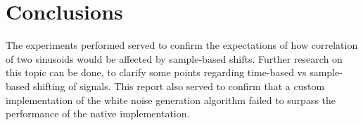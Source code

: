 \section{Conclusions}
The experiments performed served to confirm the expectations of how correlation of two sinusoids would be affected by sample-based shifts. Further research on this topic can be done, to clarify some points regarding time-based vs sample-based shifting of signals. This report also served to confirm that a custom implementation of the white noise generation algorithm failed to surpass the performance of the native implementation.